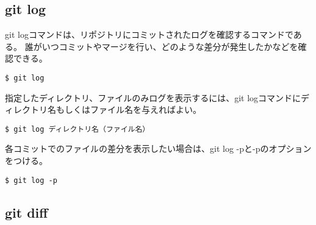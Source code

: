 \documentclass[11pt, oneside]{article}   	%
\begin{document}
\subsection{git log}
git logコマンドは、リポジトリにコミットされたログを確認するコマンドである。
誰がいつコミットやマージを行い、どのような差分が発生したかなどを確認できる。
\begin{lstlisting}
$ git log
\end{lstlisting}

指定したディレクトリ、ファイルのみログを表示するには、git logコマンドにディレクトリ名もしくはファイル名を与えればよい。
\begin{lstlisting}
$ git log ディレクトリ名（ファイル名）
\end{lstlisting}

各コミットでのファイルの差分を表示したい場合は、git log -pと-pのオプションをつける。
\begin{lstlisting}
$ git log -p
\end{lstlisting}

\subsection{git diff}
\end{document}
